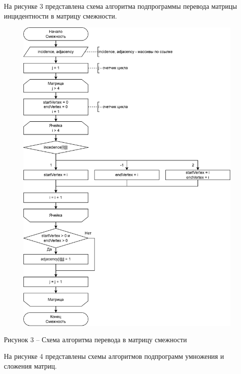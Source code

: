 \documentclass[a4paper,14pt]{extarticle}
\begin{document}
  \pagebreak
  На рисунке 3 представлена схема алгоритма подпрограммы перевода матрицы инцидентности в матрицу смежности.

  \begin{figure}[h]
    \centering
    \includegraphics[width=0.8\linewidth]{images/s-2.png}
  \end{figure}
  \begin{center}
    Рисунок 3 – Схема алгоритма перевода в матрицу смежности
  \end{center}

  \pagebreak
  На рисунке 4 представлены схемы алгоритмов подпрограмм умножения и сложения матриц.
\end{document}

